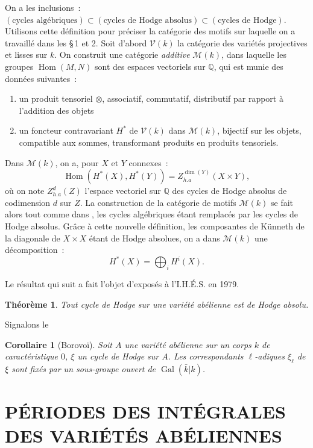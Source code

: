 \documentclass[12pt,a4paper]{article}
\theoremstyle{plain}
\newtheorem{theorem}{Théorème}
\newtheorem{corollary}{Corollaire}
\theoremstyle{definition}
\theoremstyle{remark}
\DeclareMathOperator{\Gal}{Gal}
\newcommand{\QQ}{\mathbb{Q}}
\providecommand{\QQ}{\mathbb{Q}}
\providecommand{\Hom}{\operatorname{Hom}}
\providecommand{\Gal}{\operatorname{Gal}}
\begin{document}
On a les inclusions~: $(\text{cycles algébriques}) \subset (\text{cycles de Hodge absolus}) \subset (\text{cycles de Hodge})$. Utilisons cette définition pour préciser la catégorie des motifs sur laquelle on a travaillé dans les \S\,1 et 2. Soit d'abord $\mathcal{V}(k)$ la catégorie des variétés projectives et lisses sur $k$. On construit une catégorie \emph{additive} $\mathcal{M}(k)$, dans laquelle les groupes $\Hom(M,N)$ sont des espaces vectoriels sur $\QQ$, qui est munie des données suivantes~:
\begin{enumerate}[label=\alph*)]
\item un produit tensoriel $\otimes$, associatif, commutatif, distributif par rapport à l'addition des objets
\item un foncteur contravariant $H^*$ de $\mathcal{V}(k)$ dans $\mathcal{M}(k)$, bijectif sur les objets, compatible aux sommes, transformant produits en produits tensoriels.
\end{enumerate}
Dans $\mathcal{M}(k)$, on a, pour $X$ et $Y$ connexes~:
\[
\Hom(H^*(X), H^*(Y)) = Z^{\dim(Y)}_{h.a}(X \times Y),
\]
où on note $Z^d_{h.a}(Z)$ l'espace vectoriel sur $\QQ$ des cycles de Hodge absolus de codimension $d$ sur $Z$. La construction de la catégorie de motifs $\mathcal{M}(k)$ se fait alors tout comme dans \cite{Demazure}, les cycles algébriques étant remplacés par les cycles de Hodge absolus. Grâce à cette nouvelle définition, les composantes de Künneth de la diagonale de $X \times X$ étant de Hodge absolues, on a dans $\mathcal{M}(k)$ une décomposition~:
\[
H^*(X) = \bigoplus_i H^i(X).
\]

Le résultat qui suit a fait l'objet d'exposés à l'I.H.É.S. en 1979.

\begin{theorem}
Tout cycle de Hodge sur une variété abélienne est de Hodge absolu.
\end{theorem}

Signalons le

\begin{corollary}[Borovoï]
Soit $A$ une variété abélienne sur un corps $k$ de caractéristique $0$, $\xi$ un cycle de Hodge sur $A$. Les correspondants $\ell$-adiques $\xi_\ell$ de $\xi$ sont fixés par un sous-groupe ouvert de $\Gal(\bar{k}|k)$.
\end{corollary}

\section{PÉRIODES DES INTÉGRALES DES VARIÉTÉS ABÉLIENNES}
\end{document}
